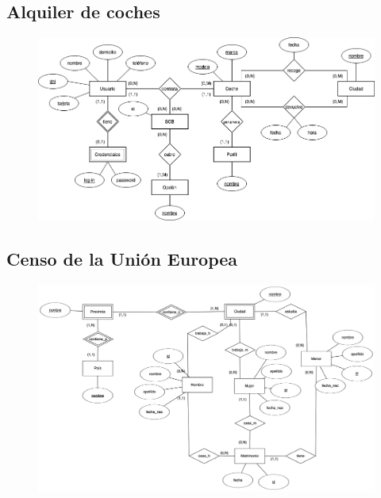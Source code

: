 \documentclass{db-practice}
\begin{document}
\subsection{Alquiler de coches}
\begin{figure}[H]
    \centering
    \includegraphics[width=\textwidth]{figs/modelado/ejercicio-8}
\end{figure}

\subsection{Censo de la Unión Europea}
\begin{figure}[H]
    \centering
    \includegraphics[width=\textwidth]{figs/modelado/ejercicio-9}
\end{figure}
\end{document}
